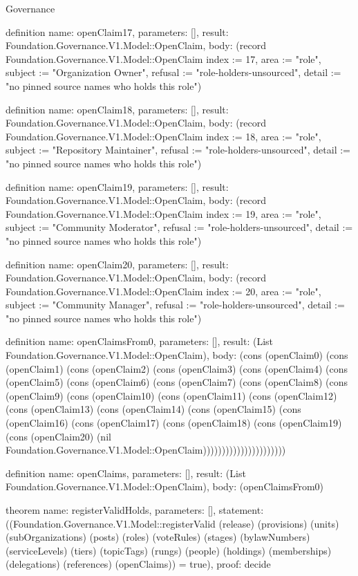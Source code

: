 \begin{lexlean}{Governance}
\begin{semanticmodule}
definition{
  name: openClaim17,
  parameters: [],
  result: Foundation.Governance.V1.Model::OpenClaim,
  body: (record Foundation.Governance.V1.Model::OpenClaim {index := 17, area := "role", subject := "Organization Owner", refusal := "role-holders-unsourced", detail := "no pinned source names who holds this role"})
}

definition{
  name: openClaim18,
  parameters: [],
  result: Foundation.Governance.V1.Model::OpenClaim,
  body: (record Foundation.Governance.V1.Model::OpenClaim {index := 18, area := "role", subject := "Repository Maintainer", refusal := "role-holders-unsourced", detail := "no pinned source names who holds this role"})
}

definition{
  name: openClaim19,
  parameters: [],
  result: Foundation.Governance.V1.Model::OpenClaim,
  body: (record Foundation.Governance.V1.Model::OpenClaim {index := 19, area := "role", subject := "Community Moderator", refusal := "role-holders-unsourced", detail := "no pinned source names who holds this role"})
}

definition{
  name: openClaim20,
  parameters: [],
  result: Foundation.Governance.V1.Model::OpenClaim,
  body: (record Foundation.Governance.V1.Model::OpenClaim {index := 20, area := "role", subject := "Community Manager", refusal := "role-holders-unsourced", detail := "no pinned source names who holds this role"})
}

definition{
  name: openClaimsFrom0,
  parameters: [],
  result: (List Foundation.Governance.V1.Model::OpenClaim),
  body: (cons (openClaim0) (cons (openClaim1) (cons (openClaim2) (cons (openClaim3) (cons (openClaim4) (cons (openClaim5) (cons (openClaim6) (cons (openClaim7) (cons (openClaim8) (cons (openClaim9) (cons (openClaim10) (cons (openClaim11) (cons (openClaim12) (cons (openClaim13) (cons (openClaim14) (cons (openClaim15) (cons (openClaim16) (cons (openClaim17) (cons (openClaim18) (cons (openClaim19) (cons (openClaim20) (nil Foundation.Governance.V1.Model::OpenClaim))))))))))))))))))))))
}

definition{
  name: openClaims,
  parameters: [],
  result: (List Foundation.Governance.V1.Model::OpenClaim),
  body: (openClaimsFrom0)
}

theorem{
  name: registerValidHolds,
  parameters: [],
  statement: ((Foundation.Governance.V1.Model::registerValid (release) (provisions) (units) (subOrganizations) (posts) (roles) (voteRules) (stages) (bylawNumbers) (serviceLevels) (tiers) (topicTags) (rungs) (people) (holdings) (memberships) (delegations) (references) (openClaims)) = true),
  proof: decide{}
}
\end{semanticmodule}
\end{lexlean}

